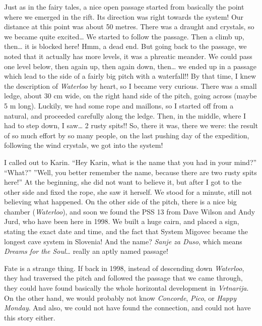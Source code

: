 Just as in the fairy tales, a nice open passage started from basically
the point where we emerged in the rift. Its direction was right towards
the system! Our distance at this point was about 50 metres. There was a
draught and crystals, so we became quite excited\ldots{} We started to
follow the passage. Then a climb up, then\ldots{} it is blocked here!
Hmm, a dead end. But going back to the passage, we noted that it
actually has more levels, it was a phreatic meander. We could pass one
level below, then again up, then again down, then\ldots{} we ended up in
a passage which lead to the side of a fairly big pitch with a
waterfall!! By that time, I knew the description of \emph{Waterloo} by
heart, so I became very curious. There was a small ledge, about 30 cm
wide, on the right hand side of the pitch, going across (maybe 5 m
long). Luckily, we had some rope and maillons, so I started off from a
natural, and proceeded carefully along the ledge. Then, in the middle,
where I had to step down, I saw\ldots{} 2 rusty spits!! So, there it
was, there we were: the result of so much effort by so many people, on
the last pushing day of the expedition, following the wind crystals, we
got into the system!

I called out to Karin. ``Hey Karin, what is the name that you had in
your mind?'' ``What?'' ''Well, you better remember the name, because
there are two rusty spits here!'' At the beginning, she did not want to
believe it, but after I got to the other side and fixed the rope, she
saw it herself. We stood for a minute, still not believing what
happened. On the other side of the pitch, there is a nice big chamber
(\emph{Waterloo}), and soon we found the PSS 13 from Dave Wilson and
Andy Jurd, who have been here in 1998. We built a huge cairn, and placed
a sign, stating the exact date and time, and the fact that System
Migovec became the longest cave system in Slovenia! And the name?
\emph{Sanje za Duso}, which means \emph{Dreams for the Soul}\ldots{}
really an aptly named passage!

Fate is a strange thing. If back in 1998, instead of descending down
\emph{Waterloo}, they had traversed the pitch and followed the passage
that we came through, they could have found basically the whole
horizontal development in \emph{Vrtnarija}. On the other hand, we would
probably not know \emph{Concorde}, \emph{Pico}, or \emph{Happy Monday}.
And also, we could not have found the connection, and could not have
this story either.

